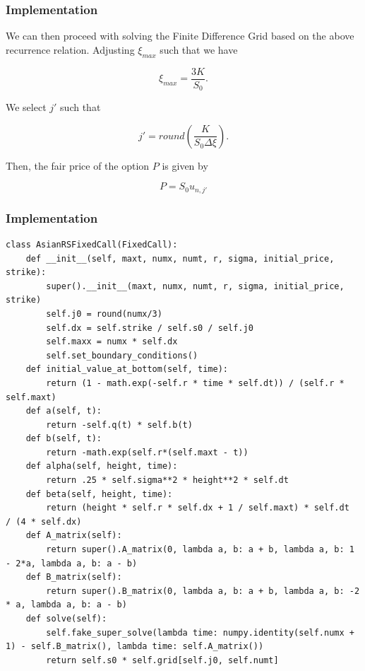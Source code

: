 \documentclass{beamer}
\begin{document}
  \begin{frame}
    \frametitle{Implementation}
    We can then proceed with solving the Finite Difference Grid based on the above recurrence relation. Adjusting \(\xi_{max}\) such that we have

    \begin{equation}
      \xi_{max} = \frac{3K}{S_0}.
    \end{equation}

    We select \(j'\) such that

    \begin{equation}
      j' = round(\frac{K}{S_0\Delta\xi}).
    \end{equation}

    Then, the fair price of the option \(P\) is given by

    \begin{equation}
      P = S_0 u_{n, j'}
    \end{equation}
  \end{frame}

  \begin{frame}[fragile]
    \frametitle{Implementation}
    \tiny
    \begin{lstlisting}
class AsianRSFixedCall(FixedCall):
    def __init__(self, maxt, numx, numt, r, sigma, initial_price, strike):
        super().__init__(maxt, numx, numt, r, sigma, initial_price, strike)
        self.j0 = round(numx/3)
        self.dx = self.strike / self.s0 / self.j0
        self.maxx = numx * self.dx
        self.set_boundary_conditions()
    def initial_value_at_bottom(self, time):
        return (1 - math.exp(-self.r * time * self.dt)) / (self.r * self.maxt)
    def a(self, t):
        return -self.q(t) * self.b(t)
    def b(self, t):
        return -math.exp(self.r*(self.maxt - t))
    def alpha(self, height, time):
        return .25 * self.sigma**2 * height**2 * self.dt
    def beta(self, height, time):
        return (height * self.r * self.dx + 1 / self.maxt) * self.dt  / (4 * self.dx)
    def A_matrix(self):
        return super().A_matrix(0, lambda a, b: a + b, lambda a, b: 1 - 2*a, lambda a, b: a - b)
    def B_matrix(self):
        return super().B_matrix(0, lambda a, b: a + b, lambda a, b: -2 * a, lambda a, b: a - b)
    def solve(self):
        self.fake_super_solve(lambda time: numpy.identity(self.numx + 1) - self.B_matrix(), lambda time: self.A_matrix())
        return self.s0 * self.grid[self.j0, self.numt]
    \end{lstlisting}
\end{frame}
\end{document}
